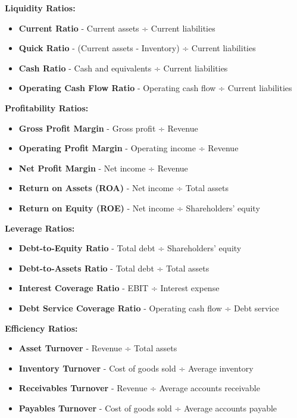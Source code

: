 \documentclass[12pt]{article}
\begin{document}
\textbf{Liquidity Ratios:}
\begin{itemize}
    \item \textbf{Current Ratio} - Current assets ÷ Current liabilities
    \item \textbf{Quick Ratio} - (Current assets - Inventory) ÷ Current liabilities
    \item \textbf{Cash Ratio} - Cash and equivalents ÷ Current liabilities
    \item \textbf{Operating Cash Flow Ratio} - Operating cash flow ÷ Current liabilities
\end{itemize}

\textbf{Profitability Ratios:}
\begin{itemize}
    \item \textbf{Gross Profit Margin} - Gross profit ÷ Revenue
    \item \textbf{Operating Profit Margin} - Operating income ÷ Revenue
    \item \textbf{Net Profit Margin} - Net income ÷ Revenue
    \item \textbf{Return on Assets (ROA)} - Net income ÷ Total assets
    \item \textbf{Return on Equity (ROE)} - Net income ÷ Shareholders' equity
\end{itemize}

\textbf{Leverage Ratios:}
\begin{itemize}
    \item \textbf{Debt-to-Equity Ratio} - Total debt ÷ Shareholders' equity
    \item \textbf{Debt-to-Assets Ratio} - Total debt ÷ Total assets
    \item \textbf{Interest Coverage Ratio} - EBIT ÷ Interest expense
    \item \textbf{Debt Service Coverage Ratio} - Operating cash flow ÷ Debt service
\end{itemize}

\textbf{Efficiency Ratios:}
\begin{itemize}
    \item \textbf{Asset Turnover} - Revenue ÷ Total assets
    \item \textbf{Inventory Turnover} - Cost of goods sold ÷ Average inventory
    \item \textbf{Receivables Turnover} - Revenue ÷ Average accounts receivable
    \item \textbf{Payables Turnover} - Cost of goods sold ÷ Average accounts payable
\end{itemize}
\end{document}
